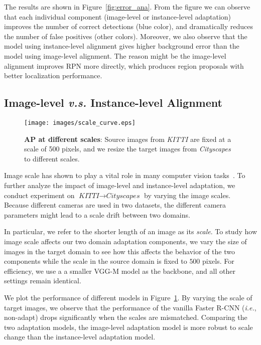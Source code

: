\documentclass[10pt,twocolumn,letterpaper]{article}
\def\ie{\emph{i.e.}}
\def\cs{\textit{Cityscapes} }
\def\kitti{\textit{KITTI} }
\begin{document}
The results are shown in Figure~\ref{fig:error_ana}. From the figure we can observe that each individual component (image-level or instance-level adaptation) improves the number of correct detections (blue color), and dramatically reduces the number of false positives (other colors). Moreover, we also observe that the model using instance-level alignment gives higher background error than the model using image-level alignment. The reason might be the image-level alignment improves RPN more directly, which produces region proposals with better localization performance.

\subsection{Image-level \textit{v.s.} Instance-level Alignment}
\begin{figure}
\centering
\texttt{[image: images/scale\_curve.eps]}
\hspace{1mm}
\caption{\textbf{AP at different scales}: Source images from \kitti are fixed at a scale of 500 pixels, and we resize the target images from \cs to different scales. }
\label{fig:scale_curve}
\vspace{-5mm}
\end{figure}

Image scale has shown to play a vital role in many computer vision tasks~\cite{chen2016scale,chen2016attention,SR4VTs}. To further analyze the impact of image-level and instance-level adaptation, we conduct experiment on $\kitti \rightarrow \cs$ by varying the image scales. Because different cameras are used in two datasets, the different camera parameters might lead to a scale drift between two domains.

In particular, we refer to the shorter length of an image as its \textit{scale}. To study how image scale affects our two domain adaptation components, we vary the size of images in the target domain to see how this affects the behavior of the two components while the scale in the source domain is fixed to $500$ pixels. For efficiency, we use a a smaller VGG-M model as the backbone, and all other settings remain identical. 

We plot the performance of different models in Figure~\ref{fig:scale_curve}. By varying the  scale of target images, we observe that the performance of the vanilla Faster R-CNN (\ie, non-adapt) drops significantly when the scales are mismatched. Comparing the two adaptation models, the image-level adaptation model is more robust to scale change than the instance-level adaptation model. 
\end{document}
